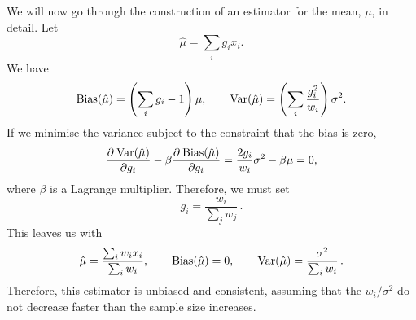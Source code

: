 \documentclass[12pt]{article}
\newcommand{\mh}{\hat\mu}
\begin{document}
We will now go through the construction of an estimator for the mean, $\mu$, in detail. Let
%
\begin{equation}\label{eq:estmeangen}
  \mh = \sum_i g_i x_i.
\end{equation}
%
We have
%
\begin{equation}\label{eq:estmeanbias}
  \bias(\mh) = \prn{\sum_i g_i -1} \mu, \qquad
  \var(\mh) = \prn{\sum_i \frac{g_i^2}{w_i}} \sigma^2.
\end{equation}
%
If we minimise the variance subject to the constraint that the bias is zero,
%
\begin{equation}\label{eq:minvarmean}
  \pdiff{\var(\mh)}{g_i} - \beta \pdiff{\bias(\mh)}{g_i} = \frac{2g_i}{w_i}\sigma^2 - \beta\mu = 0,
\end{equation}
%
where $\beta$ is a Lagrange multiplier. Therefore, we must set
%
\begin{equation}\label{eq:meanweights}
  g_i = \frac{w_i}{\sum_j w_j}\,.
\end{equation}
%
This leaves us with
%
\begin{equation}\label{eq:meanest}
  \mh = \frac{\sum_i w_i x_i}{\sum_i w_i}, \qquad
  \bias(\mh) = 0, \qquad
  \var(\mh) = \frac{\sigma^2}{\sum_i w_i}\,.
\end{equation}
%
Therefore, this estimator is unbiased and consistent, assuming that the $w_i/\sigma^2$ do not decrease faster than the sample size increases.
\end{document}
